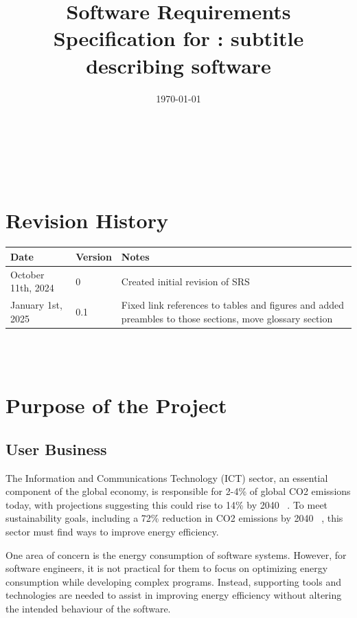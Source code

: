 \documentclass[12pt]{article}
\begin{document}

\title{Software Requirements Specification for \progname: subtitle describing software} 
\author{\authname}
\date{\today}
	
\maketitle
\thispagestyle{empty}

~\newpage

\tableofcontents

~\newpage

\section*{Revision History}

\begin{tabularx}{\textwidth}{p{3.5cm}p{2cm}X}
\toprule {\textbf{Date}} & {\textbf{Version}} & {\textbf{Notes}}\\
\midrule
October 11th, 2024 & 0 & Created initial revision of SRS\\
January 1st, 2025 & 0.1 & Fixed link references to tables and figures and added preambles to those sections, move glossary section\\
\bottomrule
\end{tabularx}

~\\

~\newpage
{}

\section{Purpose of the Project}
\subsection{User Business}
The Information and Communications Technology (ICT) sector, an essential component of the global economy, is responsible for 2-4\% of global CO2 emissions today, with projections suggesting this could rise to 14\% by 2040 ~\citep{BelkhirAndElmeligi2018}. To meet sustainability goals, including a 72\% reduction in CO2 emissions by 2040 ~\citep{FreitagAndBernersLee2021}, this sector must find ways to improve energy efficiency.

One area of concern is the energy consumption of software systems. However, for software engineers, it is not practical for them to focus on optimizing energy consumption while developing complex programs. Instead, supporting tools and technologies are needed to assist in improving energy efficiency without altering the intended behaviour of the software.
\end{document}
